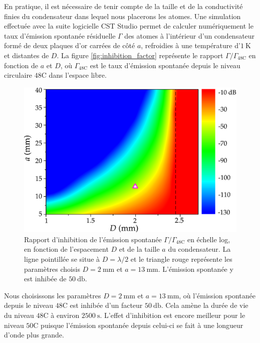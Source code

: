 En pratique, il est nécessaire de tenir compte de la taille et de la conductivité finies du condensateur dans lequel nous placerons les atomes.
Une simulation effectuée avec la suite logicielle CST Studio permet de calculer numériquement le taux d'émission spontanée résiduelle $\Gamma$ des atomes à l'intérieur d'un condensateur formé de deux plaques d'or carrées de côté $a$, refroidies à une température d'$\SI{1}{\K}$ et distantes de $D$.
La figure \eqref{fig:inhibition_factor} représente le rapport $\Gamma/\Gamma_{\mathrm{48C}}$ en fonction de $a$ et $D$, où $\Gamma_{\mathrm{48C}}$ est le taux d'émission spontanée depuis le niveau circulaire $\mathrm{48C}$ dans l'espace libre.
%
\begin{figure}[h]
\centering
\includegraphics[width=.7\linewidth]{figures/circsim/inhibition_factor}
\caption[Inhibition de l'émission spontanée en fonction des dimensions du condensateur]{
Rapport d'inhibition de l'émission spontanée $\Gamma/\Gamma_{\mathrm{48C}}$ en échelle log, en fonction de l'espacement $D$ et de la taille $a$ du condensateur.
La ligne pointillée se situe à $D=\lambda/2$ et le triangle rouge représente les paramètres choisis $D=\SI{2}{\mm}$ et $a=\SI{13}{\mm}$.
L'émission spontanée y est inhibée de $\SI{50}{\decibel}$.
}
\label{fig:inhibition_factor}
\end{figure}
%
Nous choisissons les paramètres $D=\SI{2}{\mm}$ et $a=\SI{13}{\mm}$, où l'émission spontanée depuis le niveau $\mathrm{48C}$ est inhibée d'un facteur $\SI{50}{\decibel}$.
Cela amène la durée de vie du niveau $\mathrm{48C}$ à environ $\SI{2500}{\second}$.
L'effet d'inhibition est encore meilleur pour le niveau $\mathrm{50C}$ puisque l'émission spontanée depuis celui-ci se fait à une longueur d'onde plus grande.

